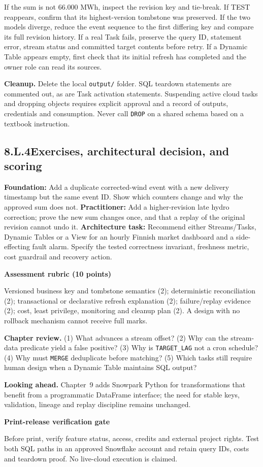 \documentclass[11pt,twoside]{article}
\newcommand{\topic}[2]{\subsection*{#1\quad #2}}
\begin{document}
If the sum is not 66.000 MWh, inspect the revision key and tie-break. If TEST reappears, confirm that its highest-version tombstone was preserved. If the two models diverge, reduce the event sequence to the first differing key and compare its full revision history. If a real Task fails, preserve the query ID, statement error, stream status and committed target contents before retry. If a Dynamic Table appears empty, first check that its initial refresh has completed and the owner role can read its sources.

\textbf{Cleanup.} Delete the local \texttt{output/} folder. SQL teardown statements are commented out, as are Task activation statements. Suspending active cloud tasks and dropping objects requires explicit approval and a record of outputs, credentials and consumption. Never call \texttt{DROP} on a shared schema based on a textbook instruction.
\topic{8.L.4}{Exercises, architectural decision, and scoring}
\textbf{Foundation:} Add a duplicate corrected-wind event with a new delivery timestamp but the same event ID. Show which counters change and why the approved sum does not. \textbf{Practitioner:} Add a higher-revision late hydro correction; prove the new sum changes once, and that a replay of the original revision cannot undo it. \textbf{Architecture task:} Recommend either Streams/Tasks, Dynamic Tables or a View for an hourly Finnish market dashboard and a side-effecting fault alarm. Specify the tested correctness invariant, freshness metric, cost guardrail and recovery action.
\begin{whitebox}\textbf{Assessment rubric (10 points)}\par
Versioned business key and tombstone semantics (2); deterministic reconciliation (2); transactional or declarative refresh explanation (2); failure/replay evidence (2); cost, least privilege, monitoring and cleanup plan (2). A design with no rollback mechanism cannot receive full marks.\end{whitebox}
\textbf{Chapter review.} (1) What advances a stream offset? (2) Why can the stream-data predicate yield a false positive? (3) Why is \texttt{TARGET\_LAG} not a cron schedule? (4) Why must \texttt{MERGE} deduplicate before matching? (5) Which tasks still require human design when a Dynamic Table maintains SQL output?\par
\textbf{Looking ahead.} Chapter~9 adds Snowpark Python for transformations that benefit from a programmatic DataFrame interface; the need for stable keys, validation, lineage and replay discipline remains unchanged.
\begin{insight}\textbf{Print-release verification gate}\par
Before print, verify feature status, access, credits and external project rights. Test both SQL paths in an approved Snowflake account and retain query IDs, costs and teardown proof. No live-cloud execution is claimed.\end{insight}
\end{document}
